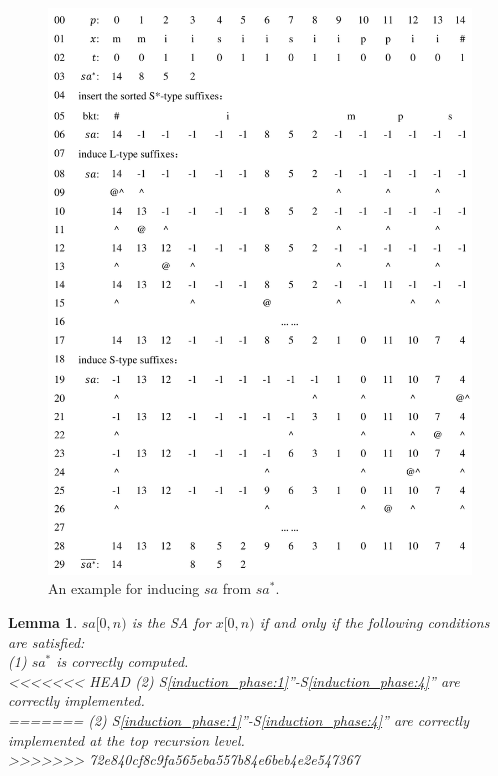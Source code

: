 \documentclass[10pt,journal,compsoc]{IEEEtran}
\newtheorem{lemma}[theorem]{Lemma}
\begin{document}
\begin{figure}[t]
	\centering
	
	\includegraphics[width = 1\columnwidth]{example.pdf}
	
	\caption{An example for inducing $sa$ from $sa^*$.}
	
	\label{fig:example1}
	
\end{figure}


\begin{lemma} \label{lemma:2}
    $sa[0, n)$ is the SA for $x[0, n)$ if and only if the following conditions are satisfied: \\
    (1) $sa^*$ is correctly computed. \\
<<<<<<< HEAD
    (2) S\ref{induction_phase:1}''-S\ref{induction_phase:4}'' are correctly implemented. \\
=======
    (2) S\ref{induction_phase:1}''-S\ref{induction_phase:4}'' are correctly implemented at the top recursion level. \\
>>>>>>> 72e840cf8c9fa565eba557b84e6beb4e2e547367
\end{lemma}
\end{document}
